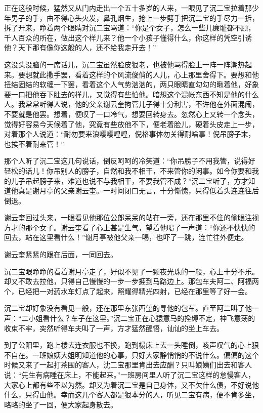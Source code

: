 \documentclass[12pt,UTF8]{ctexbook}
\begin{document}
{{{正在这般时候，猛然又从门内走出一个五十多岁的人来，一眼见了沉二宝拉着那少年男子的手，由不得心头火发，鼻孔烟生，抢上一步劈手把沉二宝的手尽力一拆，拆了开来，睁着两个眼睛对沉二宝骂道：“你是个女子，怎么一些儿廉耻都不顾，千人百众的所在，做出这个样儿来？他一个小孩子懂得什么，你这样的凭空引诱他？天下那有像你这般的人，还不给我走开去！”

这没头没脑的一席话儿，沉二宝虽然脸皮狠老，也被他骂得脸上一阵一阵潮热起来。要想就此撒手罢，看着这样的个风流俊俏的人儿，心上那里舍得下。要想和他扭结固结的软缠一下罢，看着这个人气势汹汹的，两只眼睛直勾勾的瞅着他，好象要一口把他吞下肚去的样儿，又觉得有些怕他。暗想这个混帐东西不知是他的什么人。我常常听得人说，他的父亲谢云奎拘管儿子得十分利害，不许他在外面混闹，不要就是他罢。想着，便叹了一口冷气，想要回转身去。忽然心上又转一个念头，觉得好容易今天候着了他，究竟有些放他不下，便老着脸儿，硬着头皮走上一步，对着那个人说道：“耐勿要来浪嘤嘤喤喤，倪格事体勿关得耐啥事！倪吊膀子末，也挨不着耐来管！”

那个人听了沉二宝这几句说话，倒反呵呵的冷笑道：“你吊膀子不用我管，说得好轻松的话儿！你吊别人的膀子，自然和我不相干，不来管你的闲事。如今你要和我的儿子吊起膀子来，难道也说不与我相干，不要我管不成？”沉二宝听了，方才知道他真是谢月亭的父亲谢云奎。一时间闭口无言，十分惭愧，只得低着头连连往后倒退。

谢云奎回过头来，一眼看见他那位公郎呆呆的站在一旁，还在那里不住的偷眼注视方才的那个女子。谢云奎看了心上甚是生气，望着他喝了一声道：“你还不快快的回去，站在这里看什么！”谢月亭被他父亲一喝，也吓了一跳，连忙往外便走。

谢云奎紧紧的跟在后面，一同回去。

沉二宝眼睁睁的看着谢月亭走了，好似不见了一颗夜光珠的一般，心上十分不乐。却又不敢去拉他，只得自己慢慢的一步一步捱到马路边上。那包车夫阿二、阿福两个，已经把一对药水车灯点了起来，照耀得精光四射，已经在那里等了好一会。

沉二宝却好象没有看见一般，还在那里东张西望的寻他的包车。直至阿二叫了他一声：“二小姐看什么？车子在这里。”沉二宝正在心猿意马的拴缚不定，神飞意荡的收束不牢，突然听得车夫叫了一声，方才猛然醒悟，讪讪的坐上车去。

到了公阳里，跑上楼去连衣服也不换，跑到榻床上去一头睡倒，咳声叹气的心上狠不自在。一班娘姨大姐明知道他的心事，只好大家静悄悄的不说什么。偏偏的这个时候又来了一起打茶围的客人，沈二宝那里肯出去应酬？只叫娘姨们出去和客人说：“先生有病睡在床上，不能起来。”一班房间里人听了沉二宝这样的怠慢客人，大家心上都有些不以为然。却又为着沉二宝是自己身体，又不欠什么债，不好说他什么，只得由他。幸而这几个客人都是狠本分的人，听见二宝有病，便不肯多坐，略略的坐了一回，便大家起身散去。

}}}
\end{document}
